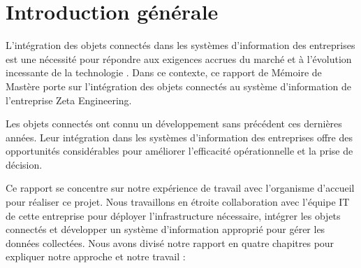 \chapter*{Introduction générale}
\large {

\setlength{\parskip}{1em}
\setlength{\parindent}{1cm}

L'intégration des objets connectés dans les systèmes d’information des entreprises est une nécessité pour répondre aux exigences accrues du marché et à l’évolution incessante de la technologie \cite{antoine2019vers}. Dans ce contexte, ce rapport de Mémoire de Mastère porte sur l'intégration des objets connectés au système d’information de l’entreprise Zeta Engineering. 


Les objets connectés ont connu un développement sans précédent ces dernières années. Leur intégration dans les systèmes d'information des entreprises offre des opportunités considérables pour améliorer l'efficacité opérationnelle et la prise de décision.

Ce rapport se concentre sur notre expérience de travail avec l'organisme d'accueil pour réaliser ce projet. Nous travaillons en étroite collaboration avec l'équipe IT de cette entreprise pour déployer l'infrastructure nécessaire, intégrer les objets connectés et développer un système d'information approprié pour gérer les données collectées. Nous avons divisé notre rapport en quatre chapitres pour expliquer notre approche et notre travail :

}
